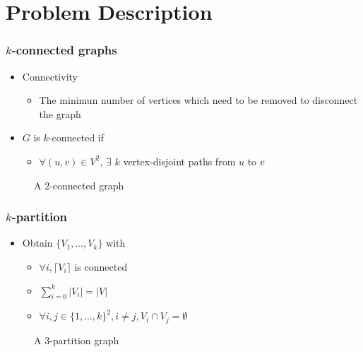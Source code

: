 \documentclass[xcolor=dvipsnames]{beamer}
\begin{document}
\section{Problem Description}

\begin{frame}
  \frametitle{$k$-connected graphs}
  \begin{itemize}
	\item Connectivity
	\begin{itemize}
	\item The minimun number of vertices which need to be removed to disconnect the graph 
	\end{itemize}
    \item $G$ is $k$-connected if 
      \begin{itemize}
      \item $\forall (u,v) \in V^2$, $\exists$ $k$ vertex-disjoint paths from $u$ to $v$
      \end{itemize}
  \end{itemize}
  \begin{figure}
    \begin{center}
    
    \end{center}
    \caption{A 2-connected graph}
  \end{figure}
\end{frame}

\begin{frame}
  \frametitle{$k$-partition}
  \begin{itemize}
  \item Obtain $\{V_1, \dots, V_k\}$ with
    \begin{itemize}
    \item $\forall i, \lceil V_i \rceil$ is connected
    \item $\sum\limits_{i=0}^k|V_i| = |V|$
    \item $\forall i,j \in \{1, \dots, k\}^2, i \neq j, V_i \cap V_j = \emptyset$
    \end{itemize}
  \end{itemize}
  \begin{figure}
    \begin{center}
      
    \end{center}
    \caption{A 3-partition graph}
  \end{figure}
\end{frame}
\end{document}
